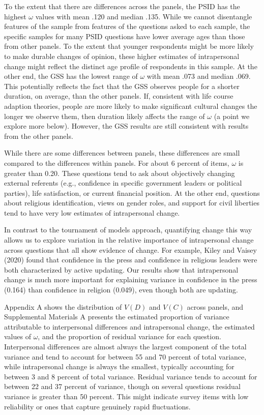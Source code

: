\documentclass[
  12pt,
]{article}
\begin{document}
To the extent that there are differences across the panels, the PSID has
the highest \(\omega\) values with mean .120 and median .135. While we
cannot disentangle features of the sample from features of the questions
asked to each sample, the specific samples for many PSID questions have
lower average ages than those from other panels. To the extent that
younger respondents might be more likely to make durable changes of
opinion, these higher estimates of intrapersonal change might reflect
the distinct age profile of respondents in this sample. At the other
end, the GSS has the lowest range of \(\omega\) with mean .073 and
median .069. This potentially reflects the fact that the GSS observes
people for a shorter duration, on average, than the other panels. If,
consistent with life course adaption theories, people are more likely to
make significant cultural changes the longer we observe them, then
duration likely affects the range of \(\omega\) (a point we explore more
below). However, the GSS results are still consistent with results from
the other panels.

While there are some differences between panels, these differences are
small compared to the differences within panels. For about 6 percent of
items, \(\omega\) is greater than 0.20. These questions tend to ask
about objectively changing external referents (e.g., confidence in
specific government leaders or political parties), life satisfaction, or
current financial position. At the other end, questions about religious
identification, views on gender roles, and support for civil liberties
tend to have very low estimates of intrapersonal change.

In contrast to the tournament of models approach, quantifying change
this way allows us to explore variation in the relative importance of
intrapersonal change across questions that all show evidence of change.
For example, Kiley and Vaisey (2020) found that confidence in the press
and confidence in religious leaders were both characterized by active
updating. Our results show that intrapersonal change is much more
important for explaining variance in confidence in the press (0.164)
than confidence in religion (0.049), even though both are updating.

Appendix A shows the distribution of \(V(D)\) and \(V(C)\) across
panels, and Supplemental Materials A presents the estimated proportion
of variance attributable to interpersonal differences and intrapersonal
change, the estimated values of \(\omega\), and the proportion of
residual variance for each question. Interpersonal differences are
almost always the largest component of the total variance and tend to
account for between 55 and 70 percent of total variance, while
intrapersonal change is always the smallest, typically accounting for
between 3 and 8 percent of total variance. Residual variance tends to
account for between 22 and 37 percent of variance, though on several
questions residual variance is greater than 50 percent. This might
indicate survey items with low reliability or ones that capture
genuinely rapid fluctuations.
\end{document}
